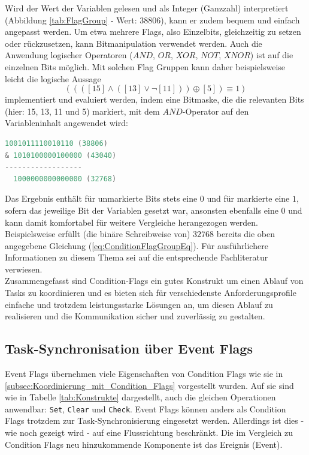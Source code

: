 \documentclass{llncs}
\begin{document}
Wird der Wert der Variablen gelesen und als Integer (Ganzzahl) interpretiert (Abbildung \ref{tab:FlagGroup} - Wert: $38806$), kann er zudem bequem und einfach angepasst werden. Um etwa mehrere Flags, also Einzelbits, gleichzeitig zu setzen oder rückzusetzen, kann Bitmanipulation verwendet werden. Auch die Anwendung logischer Operatoren ($AND$, $OR$, $XOR$, $NOT$, $XNOR$) ist auf die einzelnen Bits möglich. Mit solchen Flag Gruppen kann daher beispielsweise leicht die logische Aussage %
\begin{equation}
((([15] \wedge ([13] \vee \neg[11]))\oplus [5])\equiv 1)
\label{eq:ConditionFlagGroupEq}
\end{equation}
implementiert und evaluiert werden, indem eine Bitmaske, die die relevanten Bits (hier: 15, 13, 11 und 5) markiert, mit dem $AND$-Operator auf den Variableninhalt angewendet wird:
{
\lstset{basicstyle=\footnotesize, frame=tb, xleftmargin=.3\textwidth, xrightmargin=.3\textwidth}
\begin{lstlisting}[language=C]
  1001011110010110 (38806)
& 1010100000100000 (43040)
------------------
  1000000000000000 (32768)
\end{lstlisting}
}
Das Ergebnis enthält für unmarkierte Bits stets eine $0$ und für markierte eine $1$, sofern das jeweilige Bit der Variablen gesetzt war, ansonsten ebenfalls eine $0$ und kann damit komfortabel für weitere Vergleiche herangezogen werden. Beispielsweise erfüllt (die binäre Schreibweise von) $32768$ bereits die oben angegebene Gleichung (\ref{eq:ConditionFlagGroupEq}). Für ausführlichere Informationen zu diesem Thema sei auf die entsprechende Fachliteratur verwiesen.\\

Zusammengefasst sind Condition-Flags ein gutes Konstrukt um einen Ablauf von Tasks zu koordinieren und es bieten sich für verschiedenste Anforderungsprofile einfache und trotzdem leistungsstarke Lösungen an, um diesen Ablauf zu realisieren und die Kommunikation sicher und zuverlässig zu gestalten.

\subsection{Task-Synchronisation über Event Flags}
\label{subsec:Task-Synchronisation_Event_Flags}
Event Flags übernehmen viele Eigenschaften von Condition Flags wie sie in \ref{subsec:Koordinierung_mit_Condition_Flags} vorgestellt wurden. Auf sie sind wie in Tabelle \ref{tab:Konstrukte} dargestellt, auch die gleichen Operationen anwendbar: \texttt{Set}, \texttt{Clear} und \texttt{Check}. Event Flags können anders als Condition Flags trotzdem zur Task-Synchronisierung eingesetzt werden. Allerdings ist dies - wie noch gezeigt wird - auf eine Flussrichtung beschränkt. Die im Vergleich zu Condition Flags neu hinzukommende Komponente ist das Ereignis (Event).\\
\end{document}
